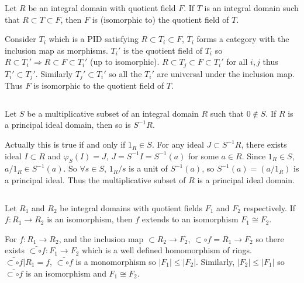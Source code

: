 $$ $$

\begin{ex}
    Let $R$ be an integral domain with quotient field $F$. If $T$ is an integral domain such that $R\subset T\subset F$, then $F$ is (isomorphic to) the quotient field of $T$.
\end{ex}

\begin{answer}
    Consider $T_{i}$ which is a PID satisfying $R\subset T_{i}\subset F$, $T_{i}$ forms a category with the inclusion map as morphisms. $T_{i}'$ is the quotient field of $T_{i}$ so $R\subset T_{i}'\Rightarrow R\subset F\subset T_{i}'$ (up to isomorphic). $R\subset T_{j}\subset F\subset T_{i}'$ for all $i,j$ thus $T_{i}'\subset T_{j}'$. Similarly $T_{j}'\subset T_{i}'$ so all the $T_{i}'$ are universal under the inclusion map. Thus $F$ is isomorphic to the quotient field of $T$.
\end{answer}

$$ $$

\begin{ex}
    Let $S$ be a multiplicative subset of an integral domain $R$ such that $0\notin S$. If $R$ is a principal ideal domain, then so is $S^{-1}R$.
\end{ex}

\begin{answer}
    Actually this is true if and only if $1_{R}\in S$. For any ideal $J\subset S^{-1}R$, there exists ideal $I\subset R$ and $\varphi_{S}(I)=J$, $J=S^{-1}I=S^{-1}(a)$ for some $a\in R$. Since $1_{R}\in S$, $a /1_{R}\in S^{-1}(a)$. So $\forall s\in S$, $1_{R} /s$ is a unit of $S^{-1}(a)$, so $S^{-1}(a)=(a /1_{R})$ is a principal ideal. Thus the multiplicative subset of $R$ is a principal ideal domain.
\end{answer}

$$ $$

\begin{ex}
    Let $R_{1}$ and $R_{2}$ be integral domains with quotient fields $F_{1}$ and $F_{2}$ respectively. If $f:R_{1}\to R_{2}$ is an isomorphism, then $f$ extends to an isomorphism $F_{1}\cong F_{2}$.
\end{ex}

\begin{answer}
    For $f:R_{1}\to R_{2}$, and the inclusion map $\subset R_{2}\to F_{2}$, $\subset\circ f=R_{1}\to F_{2}$ so there exists $\bar{\subset\circ f}:F_{1}\to F_{2}$ which is a well defined homomorphism of rings. $\bar{\subset\circ f}|R_{1}=f$, $\bar{\subset\circ f}$ is a monomorphism so $\left| F_{1} \right| \leq \left| F_{2} \right| $. Similarly, $\left| F_{2} \right| \leq \left| F_{1} \right| $ so $\bar{\subset\circ f}$ is an isomorphism and $F_{1}\cong F_{2}$.
\end{answer}

